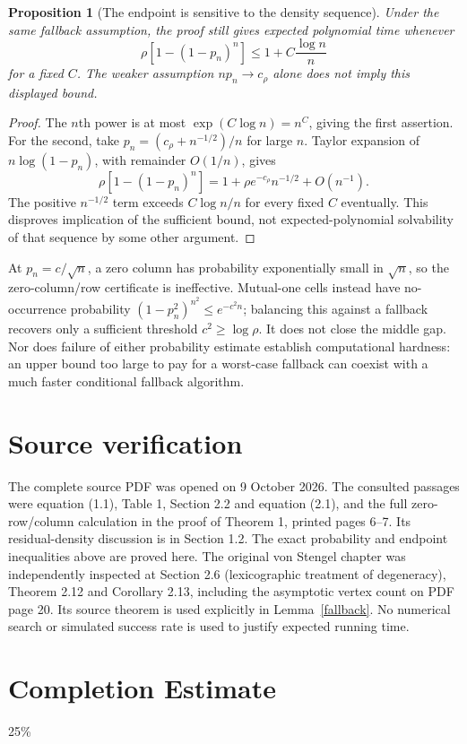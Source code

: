 \documentclass[11pt]{article}
\newtheorem{proposition}[theorem]{Proposition}
\theoremstyle{remark}
\begin{document}
\begin{proposition}[The endpoint is sensitive to the density sequence]
Under the same fallback assumption, the proof still gives expected polynomial time whenever
\[
 \rho[1-(1-p_n)^n]\leq1+C\frac{\log n}{n}
\]
for a fixed $C$. The weaker assumption $np_n\to c_\rho$ alone does not imply this displayed bound.
\end{proposition}
\begin{proof}
The $n$th power is at most $\exp(C\log n)=n^C$, giving the first assertion. For the second, take $p_n=(c_\rho+n^{-1/2})/n$ for large $n$. Taylor expansion of $n\log(1-p_n)$, with remainder $O(1/n)$, gives
\[
 \rho[1-(1-p_n)^n]=1+\rho e^{-c_\rho}n^{-1/2}+O(n^{-1}).
\]
The positive $n^{-1/2}$ term exceeds $C\log n/n$ for every fixed $C$ eventually. This disproves implication of the sufficient bound, not expected-polynomial solvability of that sequence by some other argument.
\end{proof}

At $p_n=c/\sqrt n$, a zero column has probability exponentially small in $\sqrt n$, so the zero-column/row certificate is ineffective. Mutual-one cells instead have no-occurrence probability $(1-p_n^2)^{n^2}\leq e^{-c^2n}$; balancing this against a fallback recovers only a sufficient threshold $c^2\geq\log\rho$. It does not close the middle gap. Nor does failure of either probability estimate establish computational hardness: an upper bound too large to pay for a worst-case fallback can coexist with a much faster conditional fallback algorithm.

\section{Source verification}
The complete source PDF was opened on 9 October 2026. The consulted passages were equation (1.1), Table 1, Section 2.2 and equation (2.1), and the full zero-row/column calculation in the proof of Theorem 1, printed pages 6--7. Its residual-density discussion is in Section 1.2. The exact probability and endpoint inequalities above are proved here. The original von Stengel chapter was independently inspected at Section 2.6 (lexicographic treatment of degeneracy), Theorem 2.12 and Corollary 2.13, including the asymptotic vertex count on PDF page 20. Its source theorem is used explicitly in Lemma~\ref{fallback}. No numerical search or simulated success rate is used to justify expected running time.

\section{Completion Estimate}
25\%
\end{document}

